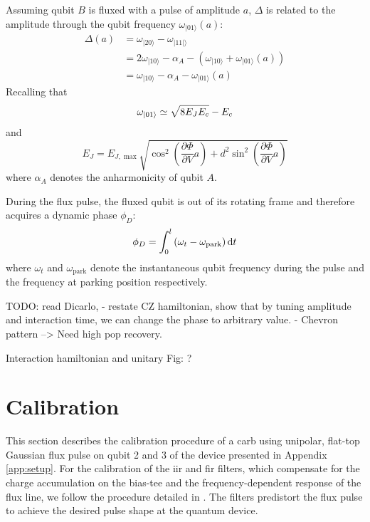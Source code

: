  Assuming qubit $B$ is fluxed with a pulse of amplitude $a$, $\Delta$ is related to the amplitude through the qubit frequency $\omega _ { | 01 \rangle }(a)$:
 \begin{equation}
\begin{aligned} 
\Delta(a) & = \omega _ { | 20 \rangle } - \omega _ { | 11 | \rangle } \\ 
& = 2 \omega _ { | 10 \rangle } - \alpha _ { A } - \left( \omega _ { | 10 \rangle } + \omega _ { | 01 \rangle }(a) \right) \\ 
& = \omega _ { | 10 \rangle } - \alpha _ { A } - \omega _ { | 01 \rangle }(a) 
\end{aligned}
\end{equation}
Recalling that
\begin{equation}
    \omega_{\ket{01}} \simeq \sqrt{8E_J E_c} - E_c
\end{equation}
and 
\begin{equation}
    E_J = E _ { J , \max } \sqrt { \cos ^ { 2 } \left( \frac { \partial \Phi } { \partial V } a \right) + d ^ { 2 } \sin ^ { 2 } \left( \frac { \partial \Phi} { \partial V } a \right) }
\end{equation}
where $\alpha_A$ denotes the anharmonicity of qubit $A$. 

During the flux pulse, the fluxed qubit is out of its rotating frame and therefore acquires a dynamic phase $\phi_D$:
\begin{equation} \label{eq:carb_dyn_phase}
    \phi_D = \int_0^l{(\omega_t-\omega_{\textrm{park}})\,\mathrm d t}
\end{equation}
where $\omega_{t}$ and $\omega_{\textrm{park}}$ denote the instantaneous qubit frequency during the pulse and the frequency at parking position respectively. 

TODO: read Dicarlo, 
- restate CZ hamiltonian, show that by tuning amplitude and interaction time, we can change the phase to arbitrary value. 
- Chevron pattern --> Need high pop recovery.

Interaction hamiltonian and unitary
Fig: ?

\section{Calibration} 
This section describes the calibration procedure of a \gls{carb} using unipolar, flat-top Gaussian flux pulse on qubit 2 and 3 of the device presented in Appendix \ref{app:setup}. 
For the calibration of the \gls{iir} and \gls{fir} filters, which compensate for the charge accumulation on the bias-tee and the frequency-dependent response of the flux line, we follow the procedure detailed in  \cite{Butscher2018ShapingFiltering}. The filters predistort the flux pulse to achieve the desired pulse shape at the quantum device.

